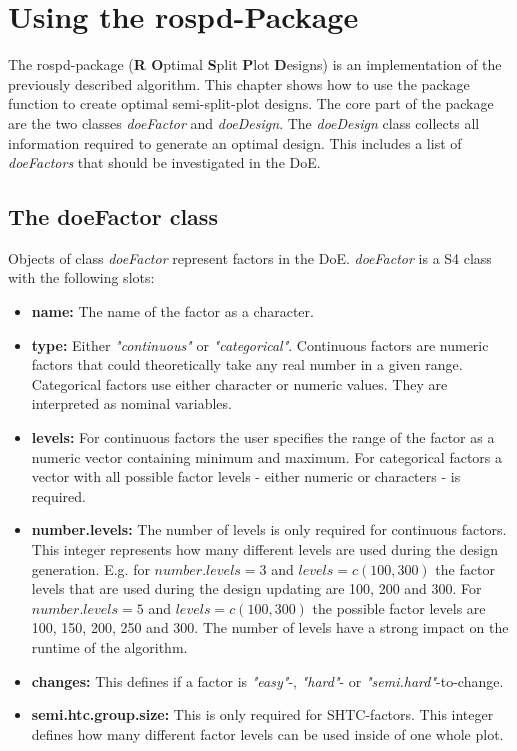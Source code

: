 \section{Using the rospd-Package} \label{rospd}

The rospd-package (\textbf{R O}ptimal \textbf{S}plit \textbf{P}lot \textbf{D}esigns) is an implementation of the previously described algorithm. This chapter shows how to use the package function to create optimal semi-split-plot designs. The core part of the package are the two classes \textit{doeFactor} and \textit{doeDesign}. The \textit{doeDesign} class collects all information required to generate an optimal design. This includes a list of \textit{doeFactors} that should be investigated in the DoE. 

\subsection{The doeFactor class}

Objects of class \textit{doeFactor} represent factors in the DoE. \textit{doeFactor} is a S4 class with the following slots:

\begin{itemize}
\item \textbf{name:} The name of the factor as a character.
\item \textbf{type:} Either \textit{"continuous"} or \textit{"categorical"}. Continuous factors are numeric factors that could theoretically take any real number in a given range. Categorical factors use either character or numeric values. They are interpreted as nominal variables.
\item \textbf{levels:} For continuous factors the user specifies the range of the factor as a numeric vector containing minimum and maximum. For categorical factors a vector with all possible factor levels - either numeric or characters - is required.
\item \textbf{number.levels:} The number of levels is only required for continuous factors. This integer represents how many different levels are used during the design generation. E.g. for $number.levels = 3$ and $levels=c(100, 300)$ the factor levels that are used during the design updating are 100, 200 and 300. For $number.levels = 5$ and $levels=c(100, 300)$ the possible factor levels are 100, 150, 200, 250 and 300. The number of levels have a strong impact on the runtime of the algorithm.
\item \textbf{changes:} This defines if a factor is \textit{"easy"}-, \textit{"hard"}- or \textit{"semi.hard"}-to-change.
\item \textbf{semi.htc.group.size:} This is only required for SHTC-factors. This integer defines how many different factor levels can be used inside of one whole plot.
\end{itemize}


